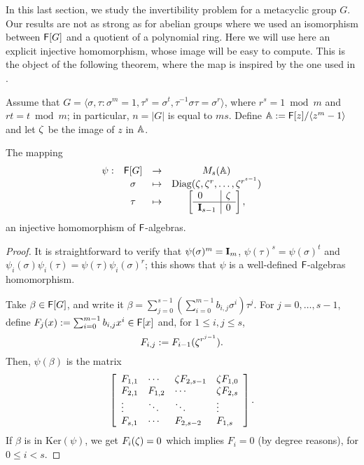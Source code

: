 In this last section, we study the invertibility problem for a
metacyclic group $G$. Our results are not as strong as for abelian groups
where  we used an isomorphism between ${\mathsf{F}}[G]$ and a quotient of a
polynomial ring.  Here we will use here an explicit injective
homomorphism, whose image will be easy to compute. This is the object
of the following theorem, where the map is inspired by the one used in
\cite[\S 47]{Curtis}.

Assume that $G = \langle \sigma , \tau : \sigma^m = 1, \tau^s =
\sigma^t, \tau^{-1} \sigma \tau = \sigma^r \rangle$, where $r^s = 1
\bmod m$ and $rt = t \bmod m$; in particular, $n=|G|$ is equal to
$ms$. Define $\mathbb{A}:={\mathsf{F}}[z]/\langle z^m-1\rangle$ and let $\zeta$ be the
image of $z$ in $\mathbb{A}$.

\begin{lemma}\label{prop:metinjection}
The mapping
\[
  \begin{array}{cccc}
\psi:& \F [G]& \to& M_s(\A) \\
&\sigma &\mapsto& \mathrm{Diag}(\zbar, \zbar^r , \ldots, \zbar^{r^{s-1}})\\
&\tau &\mapsto &
\left[ \begin{array}{l|l}
0 & \zbar\\
\hline
\mat I_{s-1} & 0
\end{array}
\right],
  \end{array}
\]
an injective homomorphism of ${\mathsf{F}}$-algebras.
\end{lemma}
\begin{proof}
It is straightforward to verify that $\psi(\sigma)^m = \mat I_m$,
$\psi(\tau)^s = \psi(\sigma)^t$ and $\psi_i(\sigma) \psi_i(\tau)
=\psi(\tau) \psi_i(\sigma)^r$; this shows that $\psi$ is a well-defined ${\mathsf{F}}$-algebras homomorphism.

Take $\beta \in {\mathsf{F}}[G]$, and write it $\beta = \sum_{j = 0}^{s-1}
\left( \sum_{i = 0}^{m-1} b_{i,j} \sigma^i \right) \tau^j$. For
$j=0,\dots,s-1$, define $F_j(x) := \sum_{i = 0}^{m-1} b_{i,j}x^i \in
{\mathsf{F}}[x]$ and, for $1 \leq i,j \leq s$,
$$F_{i,j} := F_{i-1}(\zeta^{r^{j-1}}).$$
Then, $\psi(\beta)$ is the matrix
\begin{equation}\label{eq:injection}
\left[\begin{array}{llll}
F_{1,1} &  \cdots	&	\zeta F_{2,s-1} & \zeta F_{1,0}\\
F_{2,1} & F_{1,2}& \cdots & \zeta F_{2,s}\\
\vdots &\ddots & \ddots& \vdots\\
F_{s,1}& \cdots & F_{2,s-2}	& F_{1,s}
\end{array}
\right].
\end{equation}
If $\beta$ is in $\mathrm{Ker}(\psi)$, we get $F_i(\zeta) =0$ which
implies $F_i = 0$ (by degree reasons), for $0 \leq i < s$.
\end{proof}

